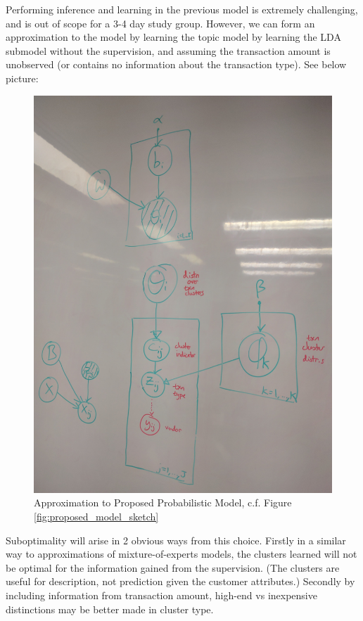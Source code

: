 \documentclass[]{article}
\begin{document}
Performing inference and learning in the previous model is extremely
challenging, and is out of scope for a 3-4 day study group. However, we
can form an approximation to the model by learning the topic model by
learning the LDA submodel without the supervision, and assuming the
transaction amount is unobserved (or contains no information about the
transaction type). See below picture:

\begin{figure}
    \centering
    \includegraphics[height=0.8\textheight]{uploads/upload_0f89a47727b7b7c85cf6125f76474d5c.jpg}
    \caption{Approximation to Proposed Probabilistic Model, c.f. Figure \ref{fig:proposed_model_sketch} }
    \label{fig:proposed_model_approx}
\end{figure}

Suboptimality will arise in 2 obvious ways from this choice. Firstly in
a similar way to approximations of mixture-of-experts models, the
clusters learned will not be optimal for the information gained from the
supervision. (The clusters are useful for description, not prediction
given the customer attributes.) Secondly by including information from
transaction amount, high-end vs inexpensive distinctions may be better
made in cluster type.
\end{document}
